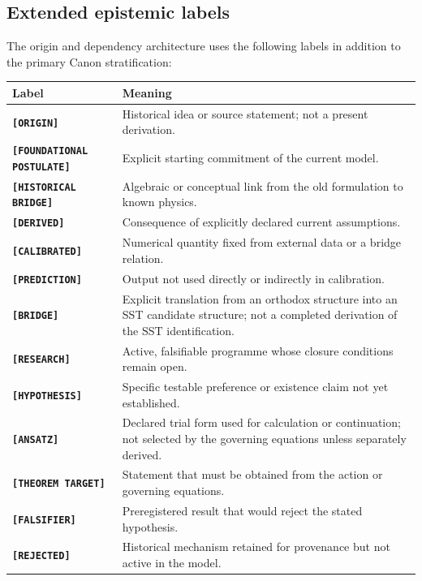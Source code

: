 \documentclass[11pt]{article}
\theoremstyle{definition}
\theoremstyle{plain}
\theoremstyle{remark}
\begin{document}
\subsection{Extended epistemic labels}
\label{subsec:extended_epistemic_labels}

The origin and dependency architecture uses the following labels in addition to
the primary Canon stratification:
\begin{center}
\begin{tabularx}{0.94\textwidth}{@{}>{\bfseries}p{}X@{}}
\toprule
Label & Meaning \\
\midrule
\texttt{[ORIGIN]} & Historical idea or source statement; not a present derivation. \\
\texttt{[FOUNDATIONAL POSTULATE]} & Explicit starting commitment of the current model. \\
\texttt{[HISTORICAL BRIDGE]} & Algebraic or conceptual link from the old formulation to known physics. \\
\texttt{[DERIVED]} & Consequence of explicitly declared current assumptions. \\
\texttt{[CALIBRATED]} & Numerical quantity fixed from external data or a bridge relation. \\
\texttt{[PREDICTION]} & Output not used directly or indirectly in calibration. \\
\texttt{[BRIDGE]} & Explicit translation from an orthodox structure into an SST candidate structure; not a completed derivation of the SST identification. \\
\texttt{[RESEARCH]} & Active, falsifiable programme whose closure conditions remain open. \\
\texttt{[HYPOTHESIS]} & Specific testable preference or existence claim not yet established. \\
\texttt{[ANSATZ]} & Declared trial form used for calculation or continuation; not selected by the governing equations unless separately derived. \\
\texttt{[THEOREM TARGET]} & Statement that must be obtained from the action or governing equations. \\
\texttt{[FALSIFIER]} & Preregistered result that would reject the stated hypothesis. \\
\texttt{[REJECTED]} & Historical mechanism retained for provenance but not active in the model. \\
\bottomrule
\end{tabularx}
\end{center}
\end{document}
